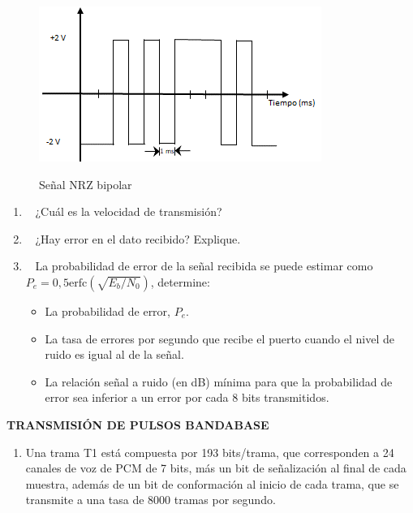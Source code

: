 \begin{enumerate}
\begin{enumerate}
\begin{figure}[h!]
	\captionsetup{justification = raggedright, singlelinecheck = false}
	\caption{Señal NRZ bipolar} 
	\centering
	\includegraphics[scale=1.4]{Imagenes/serial.png}
	\label{fig:serial}
\end{figure}

\begin{enumerate}
	\item~ ¿Cuál es la velocidad de transmisión?
	
	\item~ ¿Hay error en el dato recibido? Explique.
	
	\item~ La probabilidad de error de la señal recibida se puede estimar como $P_e=0,5\mbox{erfc}(\sqrt{E_b/N_0})$, determine:
	\begin{itemize}
		\item La probabilidad de error, $P_e$.
		
		\item La tasa de errores por segundo que recibe el puerto cuando el nivel de ruido es igual al de la señal.
		
		\item La relación señal a ruido (en dB) mínima para que la probabilidad de error sea inferior a un error por cada 8 bits transmitidos.
	\end{itemize}
\end{enumerate}
\end{enumerate}



\newpage
\begin{center}
	\textbf{TRANSMISIÓN DE PULSOS BANDABASE}
	\\
	
\end{center}

\begin{enumerate}
	\item Una trama T1 está compuesta por 193 bits/trama, que corresponden a 24 canales de voz de PCM de 7 bits, más un bit de señalización al final de cada muestra, además de un bit de conformación al inicio de cada trama, que se transmite a una tasa de 8000 tramas por segundo.
	

\end{enumerate}
\end{enumerate}
